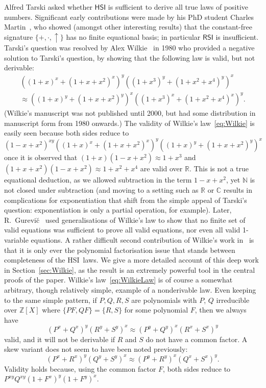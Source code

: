 \documentclass[eqnor,reqno]{amsart}
\theoremstyle{plain}
\theoremstyle{definition}
\newcommand{\HSI}{\textsf{HSI}}
\newcommand{\RSI}{\textsf{RSI}}
\begin{document}
Alfred Tarski asked whether $\HSI$ is sufficient to derive all true laws of positive numbers.
Significant early contributions were made by his PhD student Charles Martin~\cite{mar}, who showed (amongst other interesting results) that the constant-free signature $\{+,\cdot,\uparrow\}$ has no finite equational basis; in particular $\RSI$ is insufficient.  
Tarski's question was resolved by Alex Wilkie~\cite{wil00} in 1980 who provided a negative solution to Tarski's question, by showing that the following law is valid, but not derivable:
\begin{multline*}
((1+x)^x+(1+x+x^2)^x)^y((1+x^3)^y+(1+x^2+x^4)^y)^x \\
\approx ((1+x)^y+(1+x+x^2)^y)^x((1+x^3)^x+(1+x^2+x^4)^x)^y.\tag{$*$}\label{eq:Wilkie}
\end{multline*}
(Wilkie's manuscript was not published until 2000, but had some distribution in manuscript form from 1980 onwards.)
The validity of Wilkie's law~\eqref{eq:Wilkie} is easily seen because both sides reduce to 
\[
(1-x+x^2)^{xy}((1+x)^x+(1+x+x^2)^x)^y((1+x)^y+(1+x+x^2)^y)^x\tag{$*$}\label{eq:WilkieLaw}
\]
once it is observed that $(1+x)(1-x+x^2)\approx 1+x^3$ and $(1+x+x^2)(1-x+x^2)\approx 1+x^2+x^4$ are valid over $\mathbb{R}$.
This is not a true equational deduction, as we allowed subtraction in the term $1-x+x^2$, yet $\mathbb{N}$ is not closed under subtraction (and moving to a setting such as $\mathbb{R}$ or $\mathbb{C}$ results in complications for exponentiation that shift from the simple appeal of Tarski's question: exponentiation is only a partial operation, for example).  
Later, R.~Gurevi\u{c}~\cite{gur90} used generalisations of Wilkie's law to show that no finite set of valid equations was sufficient to prove all valid equations, nor even all valid 1-variable equations.
A rather difficult second contribution of Wilkie's work in~\cite{wil00} is that it is only ever the polynomial factorisation issue that stands between completeness of the \HSI\ laws.
We give a more detailed account of this deep work in Section~\ref{sec:Wilkie}, as the result is an extremely powerful tool in the central proofs of the paper.
 Wilkie's law~\eqref{eq:WilkieLaw} is of course a somewhat arbitrary, though relatively simple, example of a nonderivable law.  
Even keeping to the same simple pattern, if $P,Q,R,S$ are polynomials with $P$, $Q$ irreducible over $\mathbb{Z}[X]$ where $\{PF,QF\}=\{R,S\}$ for some polynomial $F$, then we always have 
\[
(P^x+Q^x)^y(R^y+S^y)^x\approx (P^y+Q^y)^x(R^x+S^x)^y
\]
valid, and it will not be derivable if $R$ and $S$ do not have a common factor.  
A skew variant does not seem to have been noted previously:
 \[
(P^x+R^x)^y(Q^y+S^y)^x\approx (P^y+R^y)^x(Q^x+S^x)^y.
\]
Validity holds because, using the common factor $F$, both sides reduce to $P^{xy}Q^{xy}(1+F^x)^y(1+F^y)^x$.
\end{document}
